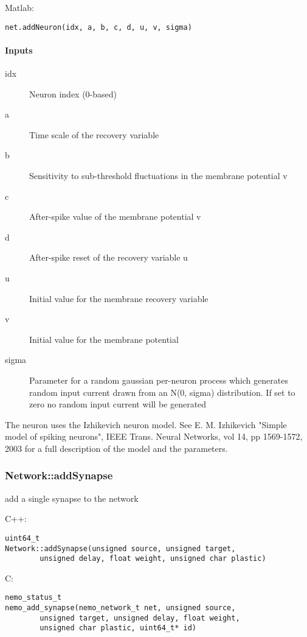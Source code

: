 \noindent Matlab:
\begin{lstlisting}[aboveskip=2pt]
net.addNeuron(idx, a, b, c, d, u, v, sigma)
\end{lstlisting}
\paragraph{Inputs}
\begin{description}
\item[idx] Neuron index (0-based)
\item[a] Time scale of the recovery variable
\item[b] Sensitivity to sub-threshold fluctuations in the membrane potential v
\item[c] After-spike value of the membrane potential v
\item[d] After-spike reset of the recovery variable u
\item[u] Initial value for the membrane recovery variable
\item[v] Initial value for the membrane potential
\item[sigma] Parameter for a random gaussian per-neuron process which generates random input current drawn from an N(0, sigma) distribution. If set to zero no random input current will be generated
\end{description}
The neuron uses the Izhikevich neuron model. See E. M. Izhikevich "Simple model of spiking neurons", IEEE Trans. Neural Networks, vol 14, pp 1569-1572, 2003 for a full description of the model and the parameters.

\clearpage
\subsubsection*{Network::addSynapse}
\label{fn: addSynapse}
add a single synapse to the network


\noindent C++:
\begin{lstlisting}[aboveskip=2pt]
uint64_t
Network::addSynapse(unsigned source, unsigned target, 
        unsigned delay, float weight, unsigned char plastic)
\end{lstlisting}

\noindent C:
\begin{lstlisting}[aboveskip=2pt]
nemo_status_t
nemo_add_synapse(nemo_network_t net, unsigned source, 
        unsigned target, unsigned delay, float weight, 
        unsigned char plastic, uint64_t* id)
\end{lstlisting}

